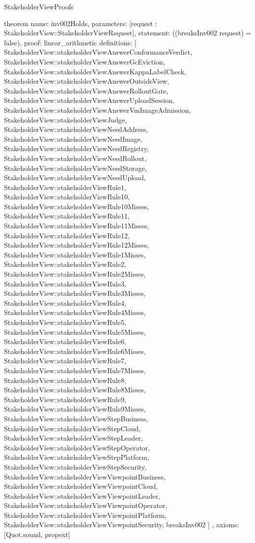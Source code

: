 \begin{lexlean}{StakeholderViewProofs}
\begin{semanticmodule}
theorem{
  name: inv002Holds,
  parameters: [request : StakeholderView::StakeholderViewRequest],
  statement: ((breaksInv002 request) = false),
  proof: linear_arithmetic{
    definitions: [
      StakeholderView::stakeholderViewAnswerConformanceVerdict,
      StakeholderView::stakeholderViewAnswerGcEviction,
      StakeholderView::stakeholderViewAnswerKappaLabelCheck,
      StakeholderView::stakeholderViewAnswerOutsideView,
      StakeholderView::stakeholderViewAnswerRolloutGate,
      StakeholderView::stakeholderViewAnswerUploadSession,
      StakeholderView::stakeholderViewAnswerVmImageAdmission,
      StakeholderView::stakeholderViewJudge,
      StakeholderView::stakeholderViewNeedAddress,
      StakeholderView::stakeholderViewNeedImage,
      StakeholderView::stakeholderViewNeedRegistry,
      StakeholderView::stakeholderViewNeedRollout,
      StakeholderView::stakeholderViewNeedStorage,
      StakeholderView::stakeholderViewNeedUpload,
      StakeholderView::stakeholderViewRule1,
      StakeholderView::stakeholderViewRule10,
      StakeholderView::stakeholderViewRule10Misses,
      StakeholderView::stakeholderViewRule11,
      StakeholderView::stakeholderViewRule11Misses,
      StakeholderView::stakeholderViewRule12,
      StakeholderView::stakeholderViewRule12Misses,
      StakeholderView::stakeholderViewRule1Misses,
      StakeholderView::stakeholderViewRule2,
      StakeholderView::stakeholderViewRule2Misses,
      StakeholderView::stakeholderViewRule3,
      StakeholderView::stakeholderViewRule3Misses,
      StakeholderView::stakeholderViewRule4,
      StakeholderView::stakeholderViewRule4Misses,
      StakeholderView::stakeholderViewRule5,
      StakeholderView::stakeholderViewRule5Misses,
      StakeholderView::stakeholderViewRule6,
      StakeholderView::stakeholderViewRule6Misses,
      StakeholderView::stakeholderViewRule7,
      StakeholderView::stakeholderViewRule7Misses,
      StakeholderView::stakeholderViewRule8,
      StakeholderView::stakeholderViewRule8Misses,
      StakeholderView::stakeholderViewRule9,
      StakeholderView::stakeholderViewRule9Misses,
      StakeholderView::stakeholderViewStepBusiness,
      StakeholderView::stakeholderViewStepCloud,
      StakeholderView::stakeholderViewStepLeader,
      StakeholderView::stakeholderViewStepOperator,
      StakeholderView::stakeholderViewStepPlatform,
      StakeholderView::stakeholderViewStepSecurity,
      StakeholderView::stakeholderViewViewpointBusiness,
      StakeholderView::stakeholderViewViewpointCloud,
      StakeholderView::stakeholderViewViewpointLeader,
      StakeholderView::stakeholderViewViewpointOperator,
      StakeholderView::stakeholderViewViewpointPlatform,
      StakeholderView::stakeholderViewViewpointSecurity,
      breaksInv002
    ]
  },
  axioms: [Quot.sound, propext]
}


\end{semanticmodule}
\end{lexlean}
